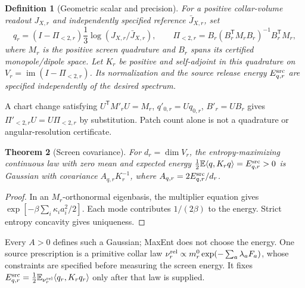 \documentclass[11pt]{article}
\newtheorem{theorem}{Theorem}[section]
\newtheorem{definition}[theorem]{Definition}
\theoremstyle{remark}
\theoremstyle{plain}
\begin{document}
\begin{definition}[Geometric scalar and precision]
\label{def:oph-screen-scalar}
For a positive collar-volume readout \(J_{X,r}\) and independently
specified reference \(\bar J_{X,r}\), set
\[
 q_r=(I-\Pi_{<2,r})\frac13\log(J_{X,r}/\bar J_{X,r}),\qquad
 \Pi_{<2,r}=B_r(B_r^{\mathsf T}M_rB_r)^{-1}B_r^{\mathsf T}M_r,
\]
where \(M_r\) is the positive screen quadrature and \(B_r\) spans its
certified monopole/dipole space. Let \(K_r\) be positive and self-adjoint
in this quadrature on \(V_r=\operatorname{im}(I-\Pi_{<2,r})\).
Its normalization and the source release energy \(E_{q,r}^{\rm src}\)
are specified independently of the desired spectrum.
\end{definition}
A chart change satisfying \(U^{\mathsf T}M'_rU=M_r\),
\(q'_{0,r}=Uq_{0,r}\), \(B'_r=UB_r\) gives
\(\Pi'_{<2,r}U=U\Pi_{<2,r}\) by substitution. Patch count alone is not
a quadrature or angular-resolution certificate.

\begin{theorem}[Screen covariance]
\label{thm:oph-screen-maxent}
For \(d_r=\dim V_r\), the entropy-maximizing continuous law with zero
mean and expected energy
\(\tfrac12\mathbb E\langle q,K_rq\rangle=E_{q,r}^{\rm src}>0\)
is Gaussian with covariance \(A_{q,r}K_r^{-1}\), where
\(A_{q,r}=2E_{q,r}^{\rm src}/d_r\).
\end{theorem}
\begin{proof}
In an \(M_r\)-orthonormal eigenbasis, the multiplier equation gives
\(\exp[-\beta\sum_i\kappa_i a_i^2/2]\). Each mode contributes
\(1/(2\beta)\) to the energy. Strict entropy concavity gives uniqueness.
\end{proof}
\label{prop:oph-screen-amplitude-nogo}
Every \(A>0\) defines such a Gaussian; MaxEnt does not choose the energy.
One source prescription is a primitive collar law
\(\nu_r^{\rm rel}\propto m_r^0\exp(-\sum_a\lambda_aF_a)\), whose
constraints are specified before measuring the screen energy. It fixes
\(E_{q,r}^{\rm src}=\tfrac12\mathbb E_{\nu_r^{\rm rel}}
\langle q_r,K_rq_r\rangle\) only after that law is supplied.
\end{document}
